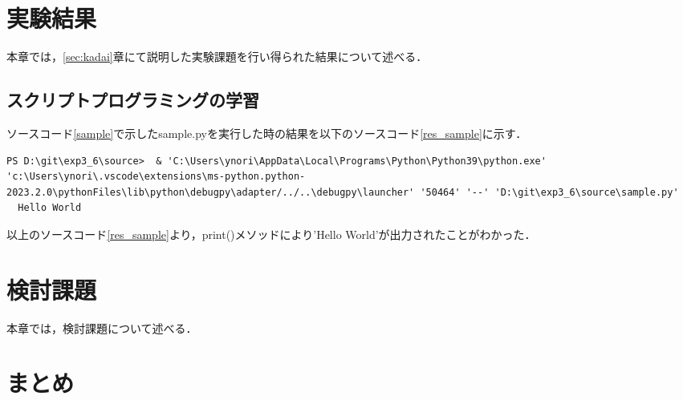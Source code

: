 \documentclass[uplatex,dvipdfmx,12pt]{jsarticle}
\begin{document}
\newpage
\section{実験結果}
本章では，\ref{sec:kadai}章にて説明した実験課題を行い得られた結果について述べる．
\subsection{スクリプトプログラミングの学習}
ソースコード\ref{sample}で示したsample.pyを実行した時の結果を以下のソースコード\ref{res_sample}に示す．

\begin{lstlisting}[caption=sample.pyの実行結果, label=res_sample]
  PS D:\git\exp3_6\source>  & 'C:\Users\ynori\AppData\Local\Programs\Python\Python39\python.exe' 'c:\Users\ynori\.vscode\extensions\ms-python.python-2023.2.0\pythonFiles\lib\python\debugpy\adapter/../..\debugpy\launcher' '50464' '--' 'D:\git\exp3_6\source\sample.py'
  Hello World
\end{lstlisting}

以上のソースコード\ref{res_sample}より，print()メソッドにより'Hello World'が出力されたことがわかった．

\newpage

\section{検討課題}
本章では，検討課題について述べる．



\newpage
\section{まとめ}

\newpage
\begin{thebibliography}{99}

\end{thebibliography}
\end{document}
